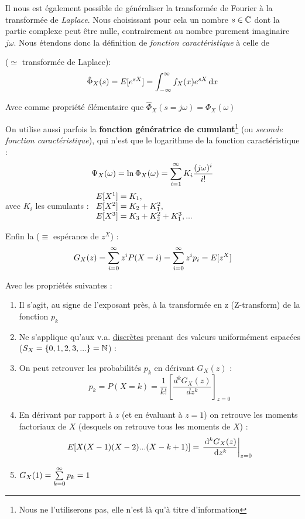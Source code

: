 \documentclass[11pt,a4paper]{article}
\numberwithin{equation}{section}
\begin{document}
Il nous est également possible de généraliser la transformée de Fourier à la transformée de \textit{Laplace}. Nous choisissant pour cela un nombre $s \in \mathbb{C}$ dont la partie complexe peut être nulle, contrairement au nombre purement imaginaire $j\omega$. Nous étendons donc la définition de \textit{fonction caractéristique} à celle de 
\begin{boite}
     ($\simeq$ transformée de Laplace):
    \begin{equation}
        \hat{\Phi}_X(s) = E[e^{sX}] = \int_{-\infty}^{\infty} f_X(x)e^{sX}\, \mathrm d x
    \end{equation}
\end{boite}
Avec comme propriété élémentaire que $\hat{\Phi}_X(s=j\omega) = \Phi_X(\omega)$

On utilise aussi parfois la \textbf{fonction génératrice de cumulant}\footnote{Nous ne l'utiliserons pas, elle n'est là qu'à titre d'information} (ou \textit{seconde fonction caractéristique}), qui n'est que le logarithme de la fonction caractéristique :
\begin{equation}
    \Psi_X(\omega) = \ln \Phi_X(\omega) = \sum\limits_{i=1}^{\infty} K_i \frac{(j\omega)^i}{i!}
\end{equation}
avec $K_i$ les cumulants : $
\begin{array}l
    E[X^1] = K_1,\\
    E[X^2] = K_2 + K_1^2,\\
    E[X^3] = K_3 + K_2^2 + K_1^3,...\\
\end{array}$

\begin{boite}
	Enfin la  ($\equiv$ espérance de $z^X$) :
	\[G_X(z) =  \sum\limits_{i=0}^{\infty} z^i P(X=i) = \sum\limits_{i=0}^{\infty}z^i p_i = E[z^X]\]
\end{boite}
Avec les propriétés suivantes :
\begin{enumerate}[label=P\arabic*.]
    \item Il s'agit, au signe de l'exposant près, à la transformée en z (Z-transform) de la fonction $p_k$
    \item Ne s'applique qu'aux v.a. \uline{discrètes} prenant des valeurs uniformément espacées ($S_X = \{0,1,2,3,...\} = \mathbb{N}$) :
    \item On peut retrouver les probabilités $p_k$ en dérivant $G_X(z)$ : \[p_k = P(X=k) = \frac{1}{k!}\left[\frac{d^k G_X(z)}{dz^k}\right]_{z=0}\]
    \item En dérivant par rapport à $z$ (et en évaluant à $z=1$) on retrouve les moments factoriaux de $X$ (desquels on retrouve tous les moments de $X$) :
        \[E[X(X-1)(X-2)...(X-k+1)] = \left.\frac{\, \mathrm d ^k G_X(z)}{\, \mathrm d z^k}\right|_{z=0}\]
    \item $G_X(1) = \sum\limits_{k=0}^{\infty} p_k = 1$
\end{enumerate}
\end{document}
